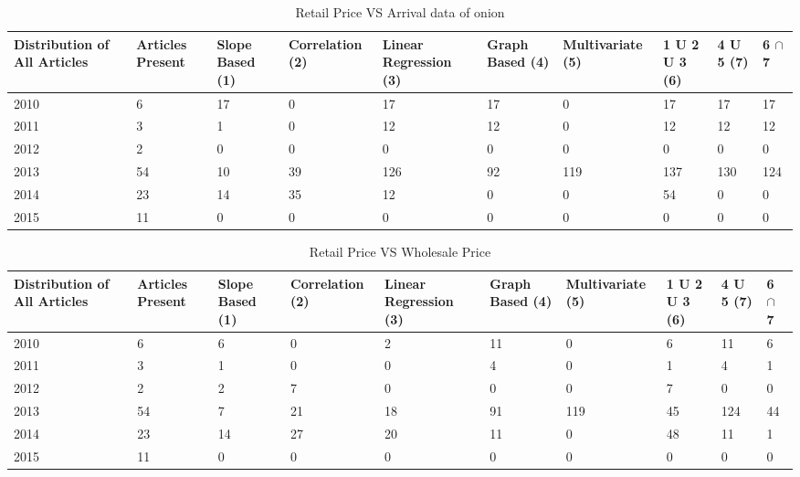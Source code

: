 \documentclass[a4paper,10pt]{report}
\begin{document}
	\begin{table}[]
	\centering
	\resizebox{\textwidth}{!}
	{\begin{tabular}{|l|l|l|l|l|l|l|l|l|l|}
	\hline
	Distribution of All Articles & Articles Present & Slope Based (1) & Correlation (2) & Linear Regression (3) & Graph Based (4) & Multivariate (5) & 1 U 2 U 3 (6) & 4 U 5 (7) & 6 $\cap$ 7  \\
	\hline
	2010 & 6  & 17 & 0  & 17  & 17 & 0   & 17  & 17  & 17  \\
	\hline
	2011 & 3  & 1  & 0  & 12  & 12 & 0   & 12  & 12  & 12  \\
	\hline
	2012 & 2  & 0  & 0  & 0   & 0  & 0   & 0   & 0   & 0   \\
	\hline
	2013 & 54 & 10 & 39 & 126 & 92 & 119 & 137 & 130 & 124 \\
	\hline
	2014 & 23 & 14 & 35 & 12  & 0  & 0   & 54  & 0   & 0   \\
	\hline
	2015 & 11 & 0  & 0  & 0   & 0  & 0   & 0   & 0   & 0  \\
	\hline
	\end{tabular}}	
	\caption{Retail Price VS Arrival data of onion}
	\label{RetailVsArrival}
	\end{table}

	
	
	
	\begin{table}[]
	\centering
	\resizebox{\textwidth}{!}
	{\begin{tabular}{|l|l|l|l|l|l|l|l|l|l|}
	\hline
	Distribution of All Articles & Articles Present & Slope Based (1) & Correlation (2) & Linear Regression (3) & Graph Based (4) & Multivariate (5) & 1 U 2 U 3 (6) & 4 U 5 (7) & 6 $\cap$ 7 \\
	\hline
	2010 & 6  & 6  & 0  & 2  & 11 & 0   & 6  & 11  & 6  \\
	\hline
	2011 & 3  & 1  & 0  & 0  & 4  & 0   & 1  & 4   & 1  \\
	\hline
	2012 & 2  & 2  & 7  & 0  & 0  & 0   & 7  & 0   & 0  \\
	\hline
	2013 & 54 & 7  & 21 & 18 & 91 & 119 & 45 & 124 & 44 \\
	\hline
	2014 & 23 & 14 & 27 & 20 & 11 & 0   & 48 & 11  & 1  \\
	\hline
	2015 & 11 & 0  & 0  & 0  & 0  & 0   & 0  & 0   & 0 \\
	\hline
	\end{tabular}}	
	\caption{Retail Price VS Wholesale Price}
	\label{RetailVsWholesale}
	\end{table}
\end{document}
